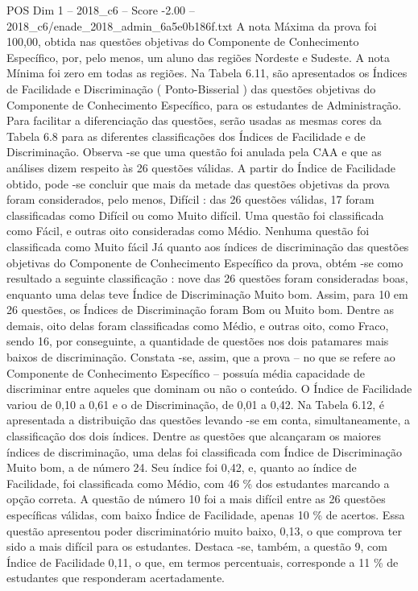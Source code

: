 \begin{textsample}{POS Dim 1 – 2018\_c6 – Score -2.00 – 2018\_c6/enade\_2018\_admin\_6a5e0b186f.txt}
A nota Máxima da prova foi 100,00, obtida nas questões objetivas do Componente de Conhecimento Específico, por, pelo menos, um aluno das regiões Nordeste e Sudeste.
A nota Mínima foi zero em todas as regiões.
Na Tabela 6.11, são apresentados os Índices de Facilidade e Discriminação ( Ponto-Bisserial ) das questões objetivas do Componente de Conhecimento Específico, para os estudantes de Administração.
Para facilitar a diferenciação das questões, serão usadas as mesmas cores da Tabela 6.8 para as diferentes classificações dos Índices de Facilidade e de Discriminação.
Observa -se que uma questão foi anulada pela CAA e que as análises dizem respeito às 26 questões válidas.
A partir do Índice de Facilidade obtido, pode -se concluir que mais da metade das questões objetivas da prova foram considerados, pelo menos, Difícil : das 26 questões válidas, 17 foram classificadas como Difícil ou como Muito difícil.
Uma questão foi classificada como Fácil, e outras oito consideradas como Médio.
Nenhuma questão foi classificada como Muito fácil Já quanto aos índices de discriminação das questões objetivas do Componente de Conhecimento Específico da prova, obtém -se como resultado a seguinte classificação : nove das 26 questões foram consideradas boas, enquanto uma delas teve Índice de Discriminação Muito bom.
Assim, para 10 em 26 questões, os Índices de Discriminação foram Bom ou Muito bom.
Dentre as demais, oito delas foram classificadas como Médio, e outras oito, como Fraco, sendo 16, por conseguinte, a quantidade de questões nos dois patamares mais baixos de discriminação.
Constata -se, assim, que a prova – no que se refere ao Componente de Conhecimento Específico – possuía média capacidade de discriminar entre aqueles que dominam ou não o conteúdo.
O Índice de Facilidade variou de 0,10 a 0,61 e o de Discriminação, de 0,01 a 0,42.
Na Tabela 6.12, é apresentada a distribuição das questões levando -se em conta, simultaneamente, a classificação dos dois índices.
Dentre as questões que alcançaram os maiores índices de discriminação, uma delas foi classificada com Índice de Discriminação Muito bom, a de número 24.
Seu índice foi 0,42, e, quanto ao índice de Facilidade, foi classificada como Médio, com 46 \% dos estudantes marcando a opção correta.
A questão de número 10 foi a mais difícil entre as 26 questões específicas válidas, com baixo Índice de Facilidade, apenas 10 \% de acertos.
Essa questão apresentou poder discriminatório muito baixo, 0,13, o que comprova ter sido a mais difícil para os estudantes.
Destaca -se, também, a questão 9, com Índice de Facilidade 0,11, o que, em termos percentuais, corresponde a 11 \% de estudantes que responderam acertadamente.

\end{textsample}
